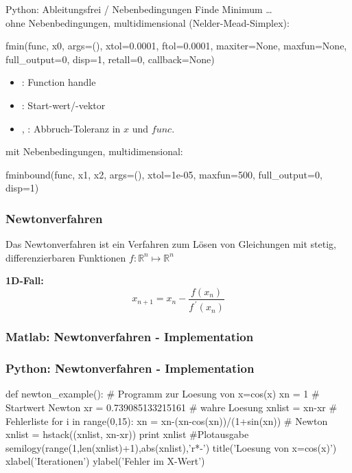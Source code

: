 \documentclass[hyperref={xetex}]{beamer}
\begin{document}
\begin{frame}[fragile]{Python: Ableitungsfrei / Nebenbedingungen}
Finde Minimum \ldots \\

ohne Nebenbedingungen, multidimensional (Nelder-Mead-Simplex):
  \begin{pyin}
fmin(func, x0, args=(), xtol=0.0001, ftol=0.0001, maxiter=None, maxfun=None, full_output=0, disp=1, retall=0, callback=None)
  \end{pyin}
  \begin{itemize}
    \item {}: Function handle
    \item {}: Start-wert/-vektor
    \item {}, : Abbruch-Toleranz in $x$ und $func$.
  \end{itemize}
mit Nebenbedingungen, multidimensional:
  \begin{pyin}
fminbound(func, x1, x2, args=(), xtol=1e-05, maxfun=500, full_output=0, disp=1)    
  \end{pyin}
\end{frame}

\begin{frame}[fragile]\frametitle{Newtonverfahren}

Das Newtonverfahren ist ein Verfahren zum Lösen von Gleichungen mit stetig, differenzierbaren 
Funktionen $f:\mathbb{R}^n \mapsto \mathbb{R}^n$

\textbf{1D-Fall:}
\[
 x_{n+1} = x_n - \frac{f(x_n)}{f^{\,\prime}(x_n)}
\]

\end{frame}

\begin{frame}[fragile]\frametitle{Matlab: Newtonverfahren - Implementation}
\end{frame}

\begin{frame}[fragile]\frametitle{Python: Newtonverfahren - Implementation}
\begin{pyin}
def newton_example():
    # Programm zur Loesung von x=cos(x)
    xn = 1 # Startwert Newton
    xr = 0.739085133215161 # wahre Loesung
    xnlist = xn-xr # Fehlerliste 
    for i in range(0,15):
        xn = xn-(xn-cos(xn))/(1+sin(xn)) # Newton
        xnlist = hstack((xnlist, xn-xr))
    print xnlist
    #Plotausgabe
    semilogy(range(1,len(xnlist)+1),abs(xnlist),'r*-')
    title('Loesung von x=cos(x)')
    xlabel('Iterationen')
    ylabel('Fehler im X-Wert')  
\end{pyin}
\end{frame}
\end{document}
